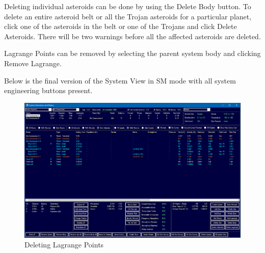 \documentclass[../Aurora C# unofficial manual.tex]{subfiles}
\begin{document}
	Deleting individual asteroids can be done by using the Delete Body button. To delete an entire asteroid belt or all the Trojan asteroids for a particular planet, click one of the asteroids in the belt or one of the Trojans and click Delete Asteroids. There will be two warnings before all the affected asteroids are deleted.
	
	Lagrange Points can be removed by selecting the parent system body and clicking Remove Lagrange.
	
	Below is the final version of the System View in SM mode with all system engineering buttons present.
	\begin{figure}[H]
		\centering
		\includegraphics[width=0.95\linewidth]{images/DeletingLagrangePoints}
		\caption[Deleting Lagrange Points]{Deleting Lagrange Points}
		\label{fig:deletinglagrangepoints}
	\end{figure}	
\end{document}
